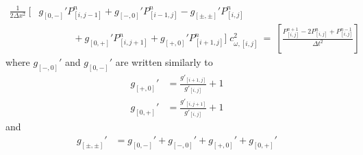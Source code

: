 \documentclass{article}
\begin{document}
	\begin{equation}
		\begin{split} \label{eq:discr_c} 
			\frac{1}{2 \Delta x^{2}} \: \Big[ &g_{[0,-]}' P_{[i,j-1]}^{n} + g_{[-,0]}' P_{[i-1,j]}^{n}
			-  g_{[\pm,\pm]}' P_{[i,j]}^{n} \\
			&\quad \quad \quad \; \; + g_{[0,+]}' P_{[i,j+1]}^{n} + g_{[+,0]}' P_{[i+1,j]}^{n} \Big] \; c_{\omega,[i,j]}^{2}
			\: = \: \left[ \frac{ P^{n+1}_{[i,j]} - 2P_{[i,j]}^{n} + P^{n-1}_{[i,j]} }{\Delta t^{2}} \right]
		\end{split}
	\end{equation}
	where $g_{[-,0]}'$ and $g_{[0,-]}'$ are written similarly to
	\begin{align}
	g_{[+,0]}'     &= \frac{g'_{[i+1,j]}}{g'_{[i,j]}}+1 \: \label{ratio1} \\ 
	g_{[0,+]}'     &= \frac{g'_{[i,j+1]}}{g'_{[i,j]}}+1 \:  \label{ratio2}
	\end{align}
	and
	\begin{align}
	g_{[\pm,\pm]}' &= g_{[0,-]}' + g_{[-,0]}' +  g_{[+,0]}' +  g_{[0,+]}' \: \label{rho_coeffs}  \nonumber
	\end{align}
\end{document}
